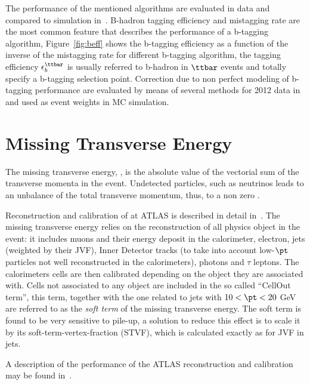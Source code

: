 The performance of the mentioned algorithms are evaluated in data  and compared to simulation in~\cite{btagPerf}.
B-hadron tagging efficiency and mistagging rate are the most common feature that describes the performance of a
b-tagging algorithm, Figure~\ref{fig:beff} shows the b-tagging efficiency as a function of the inverse of the mistagging rate
for different b-tagging algorithm, the tagging efficiency $\epsilon_b^{\ttbar}$ is usually referred to b-hadron in $\ttbar$ events
and totally specify a b-tagging selection point.
Correction due to non perfect modeling of b-tagging performance are evaluated by means of several methods
for 2012 data in~\cite{BtaggingScaleFactors, BtaggingScaleFactorsNew} and used as event weights in MC simulation.




\section{Missing Transverse Energy } \label{sec:met}
The missing transverse energy, \met, is the absolute value of the vectorial sum of the transverse momenta
in the event. Undetected particles, such as neutrinos leads to an unbalance of the total
transverse momentum, thus, to a non zero \met.

Reconstruction and calibration of \met at ATLAS is described in detail in~\cite{ETMISS}. 
The missing transverse energy relies on the reconstruction of all physics object 
in the event: it includes muons and their energy deposit in the calorimeter, electron, jets (weighted by their JVF), 
Inner Detector tracks (to take into account low-$\pt$ particles not well reconstructed in the calorimeters),
photons and $\tau$ leptons. The calorimeters cells are then calibrated depending on the
object they are associated with. Cells not associated to any object are included in the so called
 ``CellOut term'', this term,  together with the one related to jets with $10 < \pt < 20$ GeV
are referred to as the \emph{soft term} of the missing transverse energy.
The soft term is found to be very sensitive to pile-up, a solution to reduce this effect 
is to scale it by its soft-term-vertex-fraction (STVF), which is calculated exactly as for JVF in jets.

A description of the performance of the ATLAS \met reconstruction and calibration may be found in~\cite{ETMISS2}.


